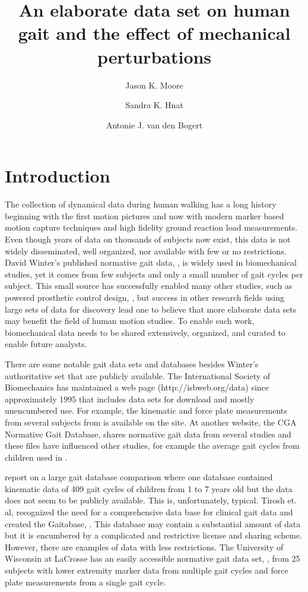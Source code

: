 \documentclass[fleqn,12pt]{wlpeerj}
\title{An elaborate data set on human gait and the effect of mechanical
  perturbations}
\author[1]{Jason K. Moore}
\author[1]{Sandra K. Hnat}
\author[1]{Antonie J. van den Bogert}
\affil[1]{Mechanical Engineering, Cleveland State University, Cleveland, Ohio,
  USA, 44115. j.k.moore19@csuohio.edu, s.hnat@vikes.csuohio.edu,
  a.vandenbogert@csuohio.edu}
\begin{document}
\flushbottom
\maketitle
\thispagestyle{empty}

\section*{Introduction}
%
The collection of dynamical data during human walking has a long history
beginning with the first motion pictures and now with modern marker based
motion capture techniques and high fidelity ground reaction load measurements.
Even though years of data on thousands of subjects now exist, this data is not
widely disseminated, well organized, nor available with few or no restrictions.
David Winter's published normative gait data, \cite{Winter1990}, is widely used
in biomechanical studies, yet it comes from few subjects and only a small
number of gait cycles per subject. This small source has successfully enabled
many other studies, such as powered prosthetic control design, \cite{Sup2008},
but success in other research fields using large sets of data for discovery
lead one to believe that more elaborate data sets may benefit the field of
human motion studies. To enable such work, biomechanical data needs to be
shared extensively, organized, and curated to enable future analysts.

There are some notable gait data sets and databases besides Winter's
authoritative set that are publicly available. The International Society of
Biomechanics has maintained a web page (http://isbweb.org/data) since
approximately 1995 that includes data sets for download and mostly unencumbered
use. For example, the kinematic and force plate measurements from several
subjects from \cite{Vaughan1992} is available on the site. At another website,
the CGA Normative Gait Database, \cite{Kirtley2014} shares normative gait data
from several studies and these files have influenced other studies, for example
the average gait cycles from children used in \cite{Bogert2003}.

\cite{Chester2007} report on a large gait database comparison where one
database contained kinematic data of 409 gait cycles of children from 1 to 7
years old but the data does not seem to be publicly available. This is,
unfortunately, typical. Tirosh et. al, recognized the need for a comprehensive
data base for clinical gait data and created the Gaitabase, \cite{Tirosh2010}.
This database may contain a substantial amount of data but it is encumbered by
a complicated and restrictive license and sharing scheme. However, there
are examples of data with less restrictions. The University of Wisconsin at
LaCrosse has an easily accessible normative gait data set, \cite{Willson2014},
from 25 subjects with lower extremity marker data from multiple gait cycles and
force plate measurements from a single gait cycle.
\end{document}
